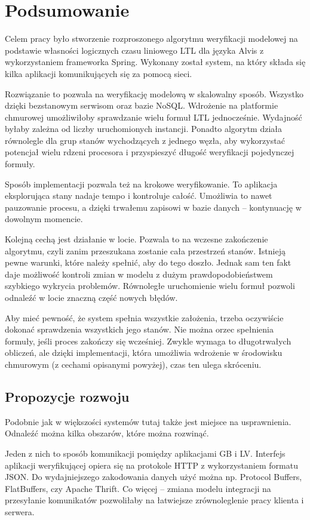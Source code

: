 \chapter{Podsumowanie}

Celem pracy było stworzenie rozproszonego algorytmu weryfikacji modelowej na podstawie własności logicznych czasu liniowego LTL dla języka Alvis z wykorzystaniem frameworka Spring.
Wykonany został system, na który składa się kilka aplikacji komunikujących się za pomocą sieci.

Rozwiązanie to pozwala na weryfikację modelową w skalowalny sposób.
Wszystko dzięki bezstanowym serwisom oraz bazie NoSQL.
Wdrożenie na platformie chmurowej umożliwiłoby sprawdzanie wielu formuł LTL jednocześnie.
Wydajność byłaby zależna od liczby uruchomionych instancji.
Ponadto algorytm działa równolegle dla grup stanów wychodzących z jednego węzła, aby wykorzystać potencjał wielu rdzeni procesora i przyspieszyć długość weryfikacji pojedynczej formuły.

Sposób implementacji pozwala też na krokowe weryfikowanie.
To aplikacja eksplorująca stany nadaje tempo i kontroluje całość.
Umożliwia to nawet pauzowanie procesu, a dzięki trwałemu zapisowi w bazie danych -- kontynuację w dowolnym momencie.

Kolejną cechą jest działanie w locie.
Pozwala to na wczesne zakończenie algorytmu, czyli zanim przeszukana zostanie cała przestrzeń stanów.
Istnieją pewne warunki, które należy spełnić, aby do tego doszło.
Jednak sam ten fakt daje możliwość kontroli zmian w modelu z dużym prawdopodobieństwem szybkiego wykrycia problemów.
Równoległe uruchomienie wielu formuł pozwoli odnaleźć w locie znaczną część nowych błędów.

Aby mieć pewność, że system spełnia wszystkie założenia, trzeba oczywiście dokonać sprawdzenia wszystkich jego stanów.
Nie można orzec spełnienia formuły, jeśli proces zakończy się wcześniej.
Zwykle wymaga to długotrwałych obliczeń, ale dzięki implementacji, która umożliwia wdrożenie w środowisku chmurowym (z cechami opisanymi powyżej), czas ten ulega skróceniu.


\section{Propozycje rozwoju}

Podobnie jak w większości systemów tutaj także jest miejsce na usprawnienia.
Odnaleźć można kilka obszarów, które można rozwinąć.

Jeden z nich to sposób komunikacji pomiędzy aplikacjami GB i LV.
Interfejs aplikacji weryfikującej opiera się na protokole HTTP z wykorzystaniem formatu JSON.
Do wydajniejszego zakodowania danych użyć można np. Protocol Buffers, FlatBuffers, czy Apache Thrift.
Co więcej -- zmiana modelu integracji na przesyłanie komunikatów pozwoliłaby na łatwiejsze zrównoleglenie pracy klienta i serwera.

